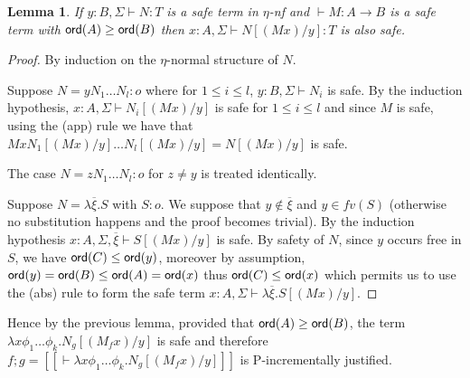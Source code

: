 \documentclass{article}
\newcommand{\sem}[1]{{[\![ #1 ]\!]}}
\newcommand{\ord}[1]{{\sf ord}(#1)}
\newtheorem{lemma}{Lemma}[section]
\theoremstyle{remark}
\theoremstyle{definition}
\begin{document}
\begin{lemma}
If $y:B, \Sigma \vdash N : T$ is a safe term in $\eta$-nf
and $\vdash M : A \rightarrow B$ is a safe term with $\ord{A} \geq \ord{B}$
then $x:A, \Sigma \vdash N[(M x)/y] :T$ is also safe. 
\end{lemma}
\begin{proof}
By induction on the $\eta$-normal structure of $N$.

Suppose $N= y N_1 \dots N_l :o$ where  for $1\leq i \leq l$, $y:B, \Sigma \vdash N_i$ is safe.
By the induction hypothesis, $x:A, \Sigma \vdash N_i[(M x)/y]$ is safe for $1\leq i \leq l$ and since $M$ is safe, using the (app) rule we have that
$M x N_1[(M x)/y] \dots N_l[(M x)/y] = N[(M x)/y]$ is safe.

The case $N= z N_1 \dots N_l :o$ for $z\neq y$ is treated identically.

Suppose $N =\lambda \overline{\xi} . S$ with $S:o$. We suppose that
$y\notin  \overline{\xi}$ and $y\in fv(S)$ (otherwise no substitution happens
and the proof becomes trivial). 
By the induction hypothesis 
$x:A,\Sigma, \overline{\xi} \vdash S [(M x)/y]$ is safe. 
By safety of $N$, since $y$ occurs free in $S$, we have
$\ord{C} \leq \ord{y}$, moreover by assumption, $\ord{y} = \ord{B} \leq \ord{A} = \ord{x}$ thus $\ord{C} \leq \ord{x}$ which permits us to use the (abs) rule
to form the safe term $x:A,\Sigma \vdash \lambda \overline{\xi} . S [(M x)/y]$.
\end{proof}

Hence by the previous lemma, provided that $\ord{A}\geq\ord{B}$, the term  $\lambda x \phi_1 \dots \phi_k. N_g [(M_f x) / y]$ is safe and therefore $f;g = \sem{\vdash \lambda x \phi_1 \dots \phi_k. N_g [(M_f x) / y]}$ is P-incrementally justified.



\end{document}
